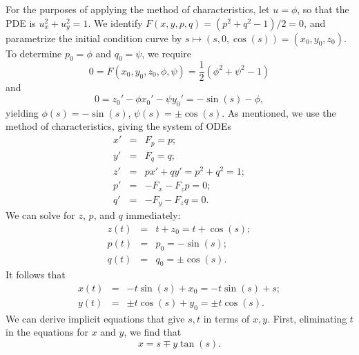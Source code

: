 \documentclass{article}
\begin{document}
\begin{enumerate}
For the purposes of applying the method of characteristics, let \(u = \phi\), so that the PDE is \(u_x^2 + u_y^2 = 1\).  We identify \(F(x,y,p,q) = (p^2 + q^2 - 1) / 2 = 0\), and parametrize the initial condition curve by \(s \mapsto (s, 0, \cos(s)) = (x_0,y_0,z_0)\).  To determine \(p_0 = \phi\) and \(q_0 = \psi\), we require
\[0 = F(x_0,y_0,z_0,\phi,\psi) = \frac{1}{2} \left( \phi^2 + \psi^2 - 1 \right)\]
and
\[0 = z_0' - \phi x_0' - \psi y_0' = -\sin(s) - \phi,\]
yielding \(\phi(s) = -\sin(s)\), \(\psi(s) = \pm \cos(s)\).  As mentioned, we use the method of characteristics, giving the system of ODEs
\begin{eqnarray*}
x' & = & F_p = p; \\
y' & = & F_q = q; \\
z' & = & p x' + q y' = p^2 + q^2 = 1; \\
p' & = & -F_x - F_z p = 0; \\
q' & = & -F_y - F_z q = 0.
\end{eqnarray*}
We can solve for \(z\), \(p\), and \(q\) immediately:
\begin{eqnarray*}
z(t) & = & t + z_0 = t + \cos(s); \\
p(t) & = & p_0 = -\sin(s); \\
q(t) & = & q_0 = \pm \cos(s).
\end{eqnarray*}
It follows that
\begin{eqnarray*}
x(t) & = & -t \sin(s) + x_0 = -t \sin(s) + s; \\
y(t) & = & \pm t \cos(s) + y_0 = \pm t \cos(s).
\end{eqnarray*}
We can derive implicit equations that give \(s,t\) in terms of \(x,y\).  First, eliminating \(t\) in the equations for \(x\) and \(y\), we find that
\[x = s \mp y \tan(s).\]





\end{enumerate}
\end{document}

